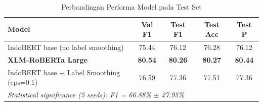 \begin{table}[h]
\centering
\caption{Perbandingan Performa Model pada Test Set}
\label{tab:model_comparison}
\begin{tabular}{lcccc}
\hline
\textbf{Model} & \textbf{Val F1} & \textbf{Test F1} & \textbf{Test Acc} & \textbf{Test P} \\
\hline
IndoBERT base (no label smoothing) & 75.44 & 76.12 & 76.28 & 76.12 \\
\textbf{XLM-RoBERTa Large} & \textbf{80.54} & \textbf{80.26} & \textbf{80.27} & \textbf{80.44} \\
IndoBERT base + Label Smoothing (eps=0.1) & 76.59 & 77.36 & 77.51 & 77.36 \\
\hline
\multicolumn{5}{l}{\textit{Statistical significance (5 seeds): F1 = 66.88\% $\pm$ 27.95\%}} \\
\hline
\end{tabular}
\end{table}
